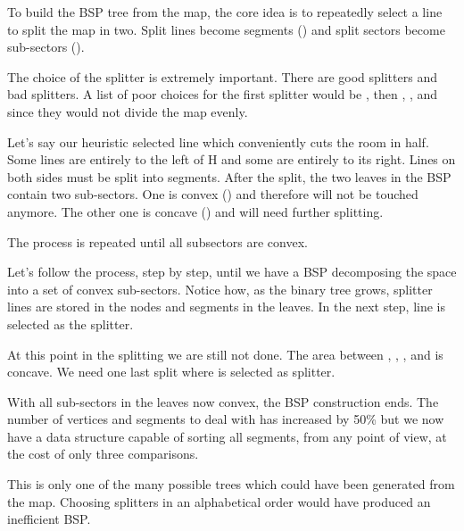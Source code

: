 To build the BSP tree from the map, the core idea is to repeatedly select a line to split the map in two. Split lines become segments () and split sectors become sub-sectors ().\\  
\par
The choice of the splitter is extremely important. There are good splitters and bad splitters. A list of poor choices for the first splitter would be , then , , and  since they would not divide the map evenly.\\ 
\par
Let's say our heuristic selected line  which conveniently cuts the room in half. Some lines are entirely to the left of H and some are entirely to its right. Lines on both sides must be split into segments.  After the split, the two leaves in the BSP contain two sub-sectors. One is convex () and therefore will not be touched anymore. The other one is concave () and will need further splitting.\\
\par
 The process is repeated until all subsectors are convex.\\
\par
{}
\par

Let's follow the process, step by step, until we have a BSP decomposing the space into a set of convex sub-sectors. Notice how, as the binary tree grows, splitter lines are stored in the nodes and segments in the leaves. In the next step, line  is selected as the splitter.
\par
{}
\par
At this point in the splitting we are still not done. The area between , , , and  is concave. We need one last split where  is selected as splitter.\\ 
\par
{}
\par
With all sub-sectors in the leaves now convex, the BSP construction ends. The number of vertices and segments to deal with has increased by 50\% but we now have a data structure capable of sorting all segments, from any point of view, at the cost of only three comparisons.\\
\par
This is only one of the many possible trees which could have been generated from the map. Choosing splitters in an alphabetical order would have produced an inefficient BSP.\\




